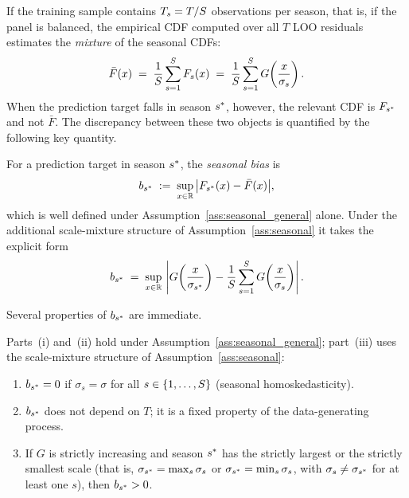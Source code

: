 If the training sample contains $T_s = T/S$ observations per
season, that is, if the panel is balanced, the empirical CDF computed
over all $T$ LOO residuals estimates the \emph{mixture} of the
seasonal CDFs:
\begin{equation}
  \label{eq:pooled_cdf}
  \bar{F}(x)
  \;=\;
  \frac{1}{S}\sum_{s=1}^{S} F_s(x)
  \;=\;
  \frac{1}{S}\sum_{s=1}^{S}
      G\!\left(\frac{x}{\sigma_s}\right).
\end{equation}
When the prediction target falls in season $s^*$, however, the
relevant CDF is $F_{s^*}$ and not $\bar{F}$.  The discrepancy
between these two objects is quantified by the following key
quantity.

\begin{definition}
\label{def:seasonal_bias}
For a prediction target in season $s^*$, the \emph{seasonal bias} is
\begin{equation}
  \label{eq:seasonal_bias}
  b_{s^*}
  \;:=\;
  \sup_{x \in \mathbb{R}}\,\bigl|F_{s^*}(x) - \bar{F}(x)\bigr|,
\end{equation}
which is well defined under Assumption~\ref{ass:seasonal_general}
alone.  Under the additional scale-mixture structure of
Assumption~\ref{ass:seasonal} it takes the explicit form
\begin{equation}
  \label{eq:seasonal_bias_scale}
  b_{s^*}
  \;=\;
  \sup_{x \in \mathbb{R}}\,
  \left|
    G\!\left(\frac{x}{\sigma_{s^*}}\right)
    -
    \frac{1}{S}\sum_{s=1}^{S}
         G\!\left(\frac{x}{\sigma_s}\right)
  \right|.
\end{equation}
\end{definition}

Several properties of $b_{s^*}$ are immediate.

\begin{lemma}
\label{lem:bias_properties}
Parts~\textup{(i)} and~\textup{(ii)} hold under
Assumption~\ref{ass:seasonal_general}; part~\textup{(iii)} uses the
scale-mixture structure of Assumption~\ref{ass:seasonal}:
\begin{enumerate}
  \item[\textup{(i)}]
    $b_{s^*} = 0$ if $\sigma_s = \sigma$ for all $s \in \{1,\ldots,S\}$
    (seasonal homoskedasticity).

  \item[\textup{(ii)}]
    $b_{s^*}$ does not depend on $T$; it is a fixed property
    of the data-generating process.

  \item[\textup{(iii)}]
    If $G$ is strictly increasing and season $s^*$ has the
    strictly largest or the strictly smallest scale (that is,
    $\sigma_{s^*} = \max_s \sigma_s$ or
    $\sigma_{s^*} = \min_s \sigma_s$, with
    $\sigma_s \neq \sigma_{s^*}$ for at least one $s$),
    then $b_{s^*} > 0$.
\end{enumerate}
\end{lemma}

